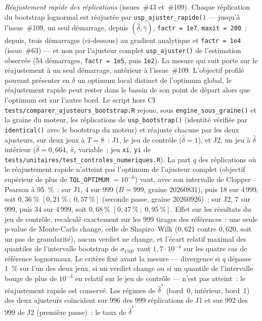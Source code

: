 \documentclass[a4paper,11pt]{article}
\newcommand{\code}[1]{\texttt{\small #1}}
\begin{document}
\emph{Réajustement rapide des réplications} (issues~\#43 et~\#109). Chaque réplication du bootstrap
lognormal est réajustée par \code{usp\_ajuster\_rapide()} --- jusqu'à l'issue~\#109, un seul
démarrage, depuis $(\hat\delta,\hat\gamma)$, \code{factr = 1e7}, \code{maxit = 200}~; depuis,
trois démarrages (ci-dessous) au gradient analytique et \code{factr = 1e4} (issue~\#63) --- et
non par l'ajusteur complet \code{usp\_ajuster()} de l'estimation observée (54 démarrages,
\code{factr = 1e5}, puis \code{1e2}). La mesure qui suit porte sur le réajustement à un seul
démarrage, antérieur à l'issue~\#109. L'objectif
profilé pouvant présenter en $\delta$ un optimum local distinct de l'optimum global, le réajustement
rapide peut rester dans le bassin de son point de départ alors que l'optimum est sur l'autre bord. Le script
hors CI \code{tests/comparer\_ajusteurs\_bootstrap.R} rejoue, sous \code{engine\_sous\_graine()}
et la graine du moteur, les réplications de \code{usp\_bootstrap()} (identité vérifiée par
\code{identical()} avec le bootstrap du moteur) et réajuste chacune par les deux ajusteurs, sur
deux jeux à $T = 8$~: J1, le jeu de contrôle ($\hat\delta = 1$), et J2, un jeu à $\hat\delta$
intérieur ($\hat\delta = 0{,}664$, $\hat\pi_t$ variable~; jeu \code{xi}, \code{yi} de
\code{tests/unitaires/test\_controles\_numeriques.R}). La part $q$ des réplications où le
réajustement rapide n'atteint pas l'optimum de l'ajusteur complet (objectif supérieur de plus de
\code{TOL\_OPTIMUM} $= 10^{-6}$) vaut, avec son intervalle de Clopper--Pearson à 95~\%~: sur J1,
4 sur 999 ($B = 999$, graine 20260831), puis 18 sur 4\,999, soit $0{,}36~\%$
$[0{,}21~\%~;~0{,}57~\%]$ (seconde passe, graine 20260926)~; sur J2, 7 sur 999, puis 34 sur
4\,999, soit $0{,}68~\%$ $[0{,}47~\%~;~0{,}95~\%]$. Effet sur les résultats du jeu de contrôle,
recalculé exactement sur les 999 tirages des références~: une seule p-value de Monte-Carlo change,
celle de Shapiro--Wilk ($0{,}621$ contre $0{,}620$, soit un pas de granularité), aucun verdict ne
change, et l'écart relatif maximal des quantiles de l'intervalle bootstrap de
$\sigma_{\mathrm{USP}}$ vaut $1{,}7\cdot 10^{-4}$ sur les quatre cas de référence lognormaux. Le
critère fixé avant la mesure --- divergence si $q$ dépasse 1~\% sur l'un des deux jeux, si un
verdict change ou si un quantile de l'intervalle bouge de plus de $10^{-3}$ en relatif sur le jeu
de contrôle --- n'est pas atteint~: le réajustement rapide est conservé. Les régimes de
$\hat\delta^{*}$ (bord~0, intérieur, bord~1) des deux ajusteurs coïncident sur 996 des
999 réplications de J1 et sur 992 des 999 de J2 (première passe)~: le taux de $\hat\delta^{*}$
\end{document}
